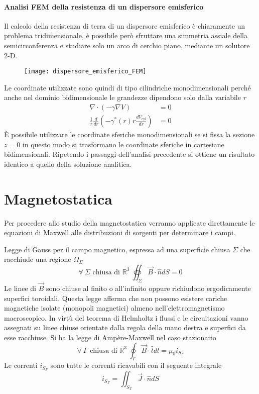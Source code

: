 
\paragraph{Analisi FEM della resistenza di un dispersore emisferico}
Il calcolo della resistenza di terra di un dispersore emisferico è chiaramente un
problema tridimensionale, è possibile però sfruttare una simmetria assiale
della semicirconferenza e studiare solo un arco di cerchio piano, mediante un
solutore 2-D.
\begin{figure}[H]
\centering
\texttt{[image: dispersore\_emisferico\_FEM]}
\end{figure}
Le coordinate utilizzate sono quindi di tipo cilindriche monodimensionali perché anche
nel dominio bidimensionale le grandezze dipendono solo dalla variabile $r$
\begin{align*}
\nabla\cdot (-\gamma\nabla V) &= 0 \\
\frac{1}{r}\frac{d}{dr}\left(-\gamma^*(r)r\frac{dV_{\text{cyl}}}{dr}\right) &= 0
\end{align*}
È possibile utilizzare le coordinate sferiche monodimensionali se si fissa la sezione
$z=0$ in questo modo si trasformano le coordinate sferiche in cartesiane bidimensionali.
Ripetendo i passaggi dell'analisi precedente si ottiene un risultato identico 
a quello della soluzione analitica.

\newpage
\section{Magnetostatica}
Per procedere allo studio della magnetostatica verranno applicate direttamente le 
equazioni di Maxwell alle distribuzioni di sorgenti per determinare i campi.

Legge di Gauss per il campo magnetico, espressa ad una superficie chiusa $\Sigma$ che 
racchiude una regione $\Omega_\Sigma$
$$
\forall\ \Sigma \text{ chiusa di }\mathbb{R}^3\ \oiint_\Sigma \vec{B}\cdot\hat{n}dS = 0
$$
Le linee di $\vec{B}$ sono chiuse al finito o all'infinito oppure
richiudono ergodicamente superfici toroidali. Questa legge afferma che non possono
esistere cariche magnetiche isolate (monopoli magnetici) almeno nell'elettromagnetismo
macroscopico.
In virtù del teorema di Helmholtz i flussi e le circuitazioni vanno assegnati su 
linee chiuse orientate dalla regola della mano destra e superfici da esse racchiuse.
Si ha la legge di Ampère-Maxwell nel caso stazionario 
$$
\forall\ \Gamma \text{ chiusa di } \mathbb{R}^3\ \oint_\Gamma \vec{B}\cdot\hat{t}dl = \mu_0 i_{S_\Gamma}
$$
Le correnti $i_{S_\Gamma}$ sono tutte le correnti ricavabili con il seguente integrale
$$
i_{S_\Gamma} = \iint_{S_\Gamma} \vec{J}\cdot\hat{n}dS
$$

